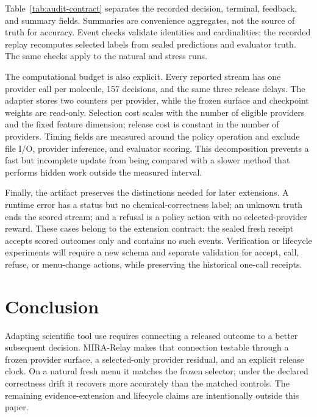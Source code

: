 \documentclass[sigconf,anonymous]{aamas}
\begin{document}
Table~\ref{tab:audit-contract} separates the recorded decision, terminal, feedback, and summary fields. Summaries are convenience aggregates, not the source of truth for accuracy. Event checks validate identities and cardinalities; the recorded replay recomputes selected labels from sealed predictions and evaluator truth. The same checks apply to the natural and stress runs.

The computational budget is also explicit. Every reported stream has one provider call per molecule, 157 decisions, and the same three release delays. The adapter stores two counters per provider, while the frozen surface and checkpoint weights are read-only. Selection cost scales with the number of eligible providers and the fixed feature dimension; release cost is constant in the number of providers. Timing fields are measured around the policy operation and exclude file I/O, provider inference, and evaluator scoring. This decomposition prevents a fast but incomplete update from being compared with a slower method that performs hidden work outside the measured interval.

Finally, the artifact preserves the distinctions needed for later extensions. A runtime error has a status but no chemical-correctness label; an unknown truth ends the scored stream; and a refusal is a policy action with no selected-provider reward. These cases belong to the extension contract: the sealed fresh receipt accepts scored outcomes only and contains no such events. Verification or lifecycle experiments will require a new schema and separate validation for accept, call, refuse, or menu-change actions, while preserving the historical one-call receipts.

\section{Conclusion}
Adapting scientific tool use requires connecting a released outcome to a better subsequent decision. MIRA-Relay makes that connection testable through a frozen provider surface, a selected-only provider residual, and an explicit release clock. On a natural fresh menu it matches the frozen selector; under the declared correctness drift it recovers more accurately than the matched controls. The remaining evidence-extension and lifecycle claims are intentionally outside this paper.

\clearpage
\balance


\end{document}
